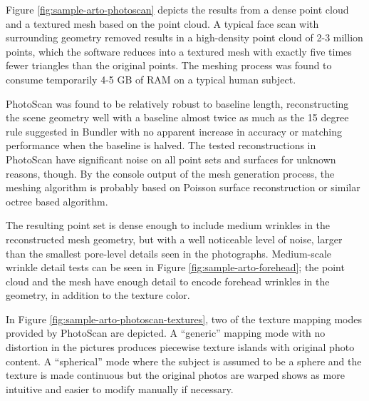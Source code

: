 Figure \ref{fig:sample-arto-photoscan} depicts the results from a dense point cloud and a textured mesh based on the point cloud.
A typical face scan with surrounding geometry removed results in a high-density point cloud of 2-3 million points, which the software reduces into a textured mesh with exactly five times fewer triangles than the original points.
The meshing process was found to consume temporarily 4-5 GB of RAM on a typical human subject.

PhotoScan was found to be relatively robust to baseline length, reconstructing the scene geometry well with a baseline almost twice as much as the 15 degree rule suggested in Bundler with no apparent increase in accuracy or matching performance when the baseline is halved.
The tested reconstructions in PhotoScan have significant noise on all point sets and surfaces for unknown reasons, though.
By the console output of the mesh generation process, the meshing algorithm is probably based on Poisson surface reconstruction or similar octree based algorithm.

The resulting point set is dense enough to include medium wrinkles in the reconstructed mesh geometry, but with a well noticeable level of noise, larger than the smallest pore-level details seen in the photographs.
Medium-scale wrinkle detail tests can be seen in Figure \ref{fig:sample-arto-forehead}; the point cloud and the mesh have enough detail to encode forehead wrinkles in the geometry, in addition to the texture color.

In Figure \ref{fig:sample-arto-photoscan-textures}, two of the texture mapping modes provided by PhotoScan are depicted.
A ``generic'' mapping mode with no distortion in the pictures produces piecewise texture islands with original photo content.
A ``spherical'' mode where the subject is assumed to be a sphere and the texture is made continuous but the original photos are warped shows as more intuitive and easier to modify manually if necessary.



